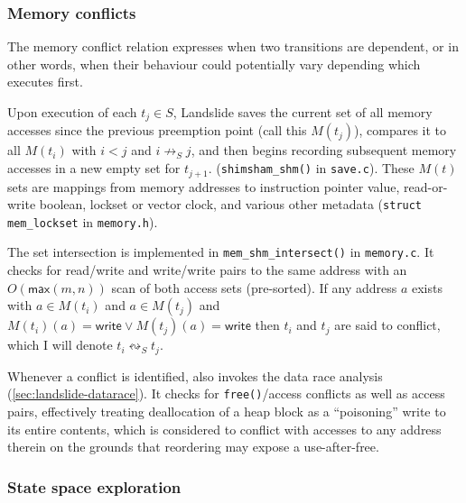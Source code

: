 \subsubsection{Memory conflicts}

The memory conflict relation expresses when two transitions are dependent,
or in other words, when their behaviour could potentially vary depending which executes first.

Upon execution of each $t_j \in S$,
Landslide saves the current set of all memory accesses since the previous preemption point (call this $M(t_j)$),
compares it to all $M(t_i)$ with $i < j$ and $i \not\rightarrow_S j$,
and then begins recording subsequent memory accesses in a new empty set for $t_{j+1}$.
({\tt shimsham\_shm()} in {\tt save.c}).
These $M(t)$ sets are mappings from memory addresses to
instruction pointer value, read-or-write boolean, lockset or vector clock, and various other metadata
({\tt struct mem\_lockset} in {\tt memory.h}).

The set intersection is implemented in {\tt mem\_shm\_intersect()} in {\tt memory.c}.
It checks for read/write and write/write pairs to the same address with an $O(\mathsf{max}(m,n))$ scan of both access sets (pre-sorted).
If any address $a$ exists with $a \in M(t_i)$ and $a \in M(t_j)$ and $M(t_i)(a) = \mathsf{write} \vee M(t_j)(a) = \mathsf{write}$
then $t_i$ and $t_j$ are said to conflict,
which I will denote $t_i \leftrightsquigarrow_S t_j$.

Whenever a conflict is identified,
 also invokes the data race analysis (\cref{sec:landslide-datarace}).
It checks for {\tt free()}/access conflicts as well as access pairs,
effectively treating deallocation of a heap block as a ``poisoning'' write to its entire contents,
which is considered to conflict with accesses to any address therein
on the grounds that reordering may expose a use-after-free.

\subsubsection{State space exploration}
\label{sec:landslide-explore}


